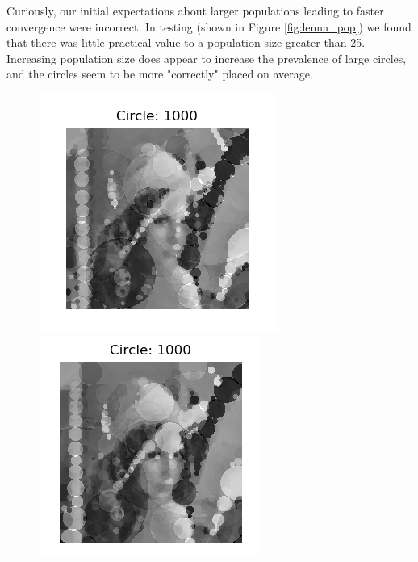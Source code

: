 \documentclass[12pt]{article}
\begin{document}
Curiously, our initial expectations about larger populations leading to faster convergence were incorrect. In testing (shown in Figure \ref{fig:lenna_pop}) we found that there was little practical value to a population size greater than 25. Increasing population size does appear to increase the prevalence of large circles, and the circles seem to be more "correctly" placed on average. 
\begin{figure}[H]
\centering
\noindent\includegraphics[width=\textwidth/6]{../results/lenna/lenna_pop10}
\noindent\includegraphics[width=\textwidth/6]{../results/lenna/lenna_pop20}

\end{figure}
\end{document}
